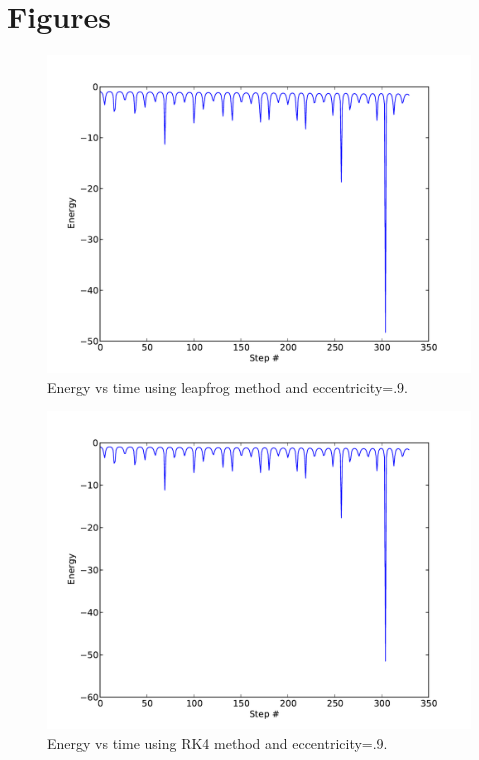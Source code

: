 \documentclass[a4paper,11pt]{article}
\begin{document}
\section*{Figures}
\begin{figure}[h!]
\begin{center}
\includegraphics[scale=.7]{E_T_3lf.pdf}
\caption{Energy vs time using leapfrog method and eccentricity=.9.}
\end{center}
\end{figure}

\begin{figure}[h!]
\begin{center}
\includegraphics[scale=.7]{E_T_3rk4.pdf}
\caption{Energy vs time using RK4 method and eccentricity=.9.}
\end{center}
\end{figure}
\end{document}
